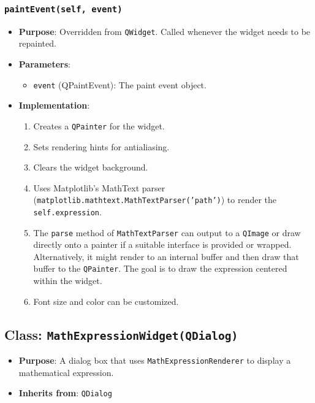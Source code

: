 \documentclass[12pt,a4paper]{report}
\begin{document}
\subsubsection{\texttt{paintEvent(self, event)}}
\begin{itemize}
    \item \textbf{Purpose}: Overridden from \texttt{QWidget}. Called whenever the widget needs to be repainted.
    \item \textbf{Parameters}:
        \begin{itemize}
            \item \texttt{event} (QPaintEvent): The paint event object.
        \end{itemize}
    \item \textbf{Implementation}:
        \begin{enumerate}
            \item Creates a \texttt{QPainter} for the widget.
            \item Sets rendering hints for antialiasing.
            \item Clears the widget background.
            \item Uses Matplotlib's MathText parser (\texttt{matplotlib.mathtext.MathTextParser('path')}) to render the \texttt{self.expression}.
            \item The \texttt{parse} method of \texttt{MathTextParser} can output to a \texttt{QImage} or draw directly onto a painter if a suitable interface is provided or wrapped. Alternatively, it might render to an internal buffer and then draw that buffer to the \texttt{QPainter}. The goal is to draw the expression centered within the widget.
            \item Font size and color can be customized.
        \end{enumerate}
\end{itemize}

\subsection{Class: \texttt{MathExpressionWidget(QDialog)}}
\begin{itemize}
    \item \textbf{Purpose}: A dialog box that uses \texttt{MathExpressionRenderer} to display a mathematical expression.
    \item \textbf{Inherits from}: \texttt{QDialog}
\end{itemize}
\end{document}
